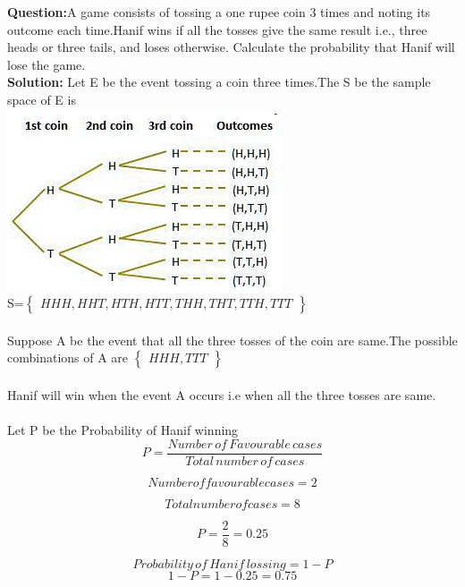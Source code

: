 \documentclass[journal,12pt,twocolumn]{IEEEtran}
\begin{document}
\maketitle
\newpage

\bigskip
\renewcommand{\thefigure}{\theenumi}
\renewcommand{\thetable}{\theenumi}

{\textbf{Question:}}A game consists of tossing a one rupee coin 3 times and noting its outcome each time.Hanif wins if all the tosses give the same result i.e., three heads or three tails, and loses
otherwise. Calculate the probability that Hanif will lose the game.\\

{\textbf{Solution:}}
Let E be the event tossing a coin three times.The S be the sample space of E is \\  
\noindent \includegraphics{./HW1.jpg}
\\
S=$\begin{Bmatrix}
    HHH,HHT,HTH,HTT,THH,THT,TTH,TTT \end{Bmatrix}$
\\
\\
Suppose A be the event that all the three tosses of the coin are same.The possible combinations of A are $\begin{Bmatrix} HHH,TTT \end{Bmatrix}$
\\
\\
Hanif will win when the event A occurs i.e when all the three tosses are same.\\ \\
Let P be the Probability of Hanif winning \\
\begin{equation}
  {P}  = \frac{Number\,of\,Favourable\,cases}{Total\,number\,of\,cases}
\end{equation}

\begin{equation}
Number of favourable cases = 2
\end{equation}

\begin{equation}
Total number of cases = 8
\end{equation}

\begin{equation}
    P = \frac{2}{8} = 0.25
\end{equation}

\begin{equation}
Probability\,of\,Hanif\,lossing = 1 - P
\end{equation}
\begin{equation}
  1-P = 1-0.25 = 0.75
\end{equation}
\end{document}
